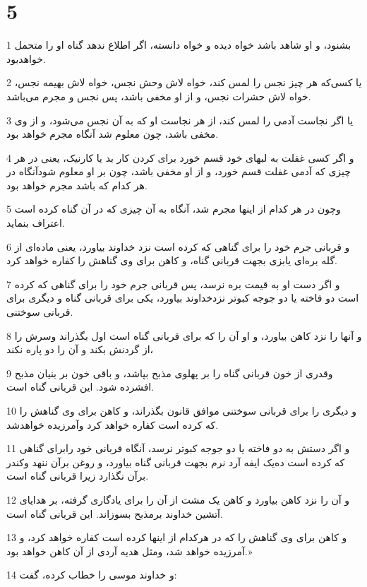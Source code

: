 \chapter{5}

\par 1 بشنود، و او شاهد باشد خواه دیده و خواه دانسته، اگر اطلاع ندهد گناه او را متحمل خواهدبود.
\par 2 یا کسی‌که هر چیز نجس را لمس کند، خواه لاش وحش نجس، خواه لاش بهیمه نجس، خواه لاش حشرات نجس، و از او مخفی باشد، پس نجس و مجرم می‌باشد.
\par 3 یا اگر نجاست آدمی را لمس کند، از هر نجاست او که به آن نجس می‌شود، و از وی مخفی باشد، چون معلوم شد آنگاه مجرم خواهد بود.
\par 4 و اگر کسی غفلت به لبهای خود قسم خورد برای کردن کار بد یا کارنیک، یعنی در هر چیزی که آدمی غفلت قسم خورد، و از او مخفی باشد، چون بر او معلوم شودآنگاه در هر کدام که باشد مجرم خواهد بود.
\par 5 وچون در هر کدام از اینها مجرم شد، آنگاه به آن چیزی که در آن گناه کرده است اعتراف بنماید.
\par 6 و قربانی جرم خود را برای گناهی که کرده است نزد خداوند بیاورد، یعنی ماده‌ای از گله بره‌ای یابزی بجهت قربانی گناه، و کاهن برای وی گناهش را کفاره خواهد کرد.
\par 7 و اگر دست او به قیمت بره نرسد، پس قربانی جرم خود را برای گناهی که کرده است دو فاخته یا دو جوجه کبوتر نزدخداوند بیاورد، یکی برای قربانی گناه و دیگری برای قربانی سوختنی.
\par 8 و آنها را نزد کاهن بیاورد، و او آن را که برای قربانی گناه است اول بگذراند وسرش را از گردنش بکند و آن را دو پاره نکند،
\par 9 وقدری از خون قربانی گناه را بر پهلوی مذبح بپاشد، و باقی خون بر بنیان مذبح افشرده شود. این قربانی گناه است.
\par 10 و دیگری را برای قربانی سوختنی موافق قانون بگذراند، و کاهن برای وی گناهش را که کرده است کفاره خواهد کرد وآمرزیده خواهدشد.
\par 11 و اگر دستش به دو فاخته یا دو جوجه کبوتر نرسد، آنگاه قربانی خود رابرای گناهی که کرده است ده‌یک ایفه آرد نرم بجهت قربانی گناه بیاورد، و روغن برآن ننهد وکندر برآن نگذارد زیرا قربانی گناه است.
\par 12 و آن را نزد کاهن بیاورد و کاهن یک مشت از آن را برای یادگاری گرفته، بر هدایای آتشین خداوند برمذبح بسوزاند. این قربانی گناه است.
\par 13 و کاهن برای وی گناهش را که در هرکدام از اینها کرده است کفاره خواهد کرد، و آمرزیده خواهد شد، ومثل هدیه آردی از آن کاهن خواهد بود.»
\par 14 و خداوند موسی را خطاب کرده، گفت:
